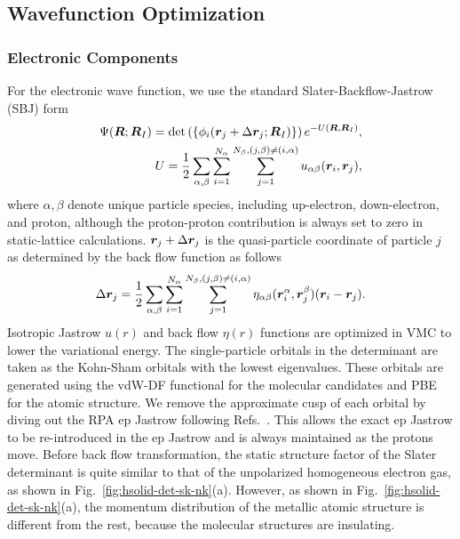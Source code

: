 \subsection{Wavefunction Optimization}

\subsubsection{Electronic Components}
For the electronic wave function, we use the standard Slater-Backflow-Jastrow (SBJ) form
\begin{align}
\Psi(\boldsymbol{R};\boldsymbol{R}_I) = \det\left( \{ \phi_i(\boldsymbol{r}_j+\Delta\boldsymbol{r}_j;\boldsymbol{R}_I)\} \right) e^{-U(\boldsymbol{R},\boldsymbol{R}_I)}, \\
U = \frac{1}{2}\sum\limits_{\alpha, \beta} \sum\limits_{i=1}^{N_\alpha} \sum\limits_{j=1}^{N_\beta, (j,\beta)\neq(i,\alpha)} u_{\alpha\beta}(\boldsymbol{r}_i, \boldsymbol{r}_j), \label{eq:hsolid-ujas}
\end{align}
where $\alpha, \beta$ denote unique particle species, including up-electron, down-electron, and proton, although the proton-proton contribution is always set to zero in static-lattice calculations. $\boldsymbol{r}_j+\Delta\boldsymbol{r}_j$ is the quasi-particle coordinate of particle $j$ as determined by the back flow function as follows
\begin{align}
\Delta \boldsymbol{r}_j = \frac{1}{2}\sum\limits_{\alpha, \beta} \sum\limits_{i=1}^{N_\alpha} \sum\limits_{j=1}^{N_\beta, (j,\beta)\neq(i,\alpha)} \eta_{\alpha\beta}(\boldsymbol{r}_i^\alpha, \boldsymbol{r}_j^\beta)(\boldsymbol{r}_i-\boldsymbol{r}_j).
\label{eq:hsolid-bf}
\end{align}
Isotropic Jastrow $u(r)$ and back flow $\eta(r)$ functions are optimized in VMC to lower the variational energy.
The single-particle orbitals in the determinant are taken as the Kohn-Sham orbitals with the lowest eigenvalues.
These orbitals are generated using the vdW-DF functional for the molecular candidates and PBE for the atomic structure. We remove the approximate cusp of each orbital by diving out the RPA ep Jastrow following Refs.~\cite{Ceperley1987,Natoli1993,Natoli1995}.
This allows the exact ep Jastrow to be re-introduced in the ep Jastrow and is always maintained as the protons move.
Before back flow transformation, the static structure factor of the Slater determinant is quite similar to that of the unpolarized homogeneous electron gas, as shown in Fig.~\ref{fig:hsolid-det-sk-nk}(a). However, as shown in  Fig.~\ref{fig:hsolid-det-sk-nk}(a), the momentum distribution of the metallic atomic structure is different from the rest, because the molecular structures are insulating.

